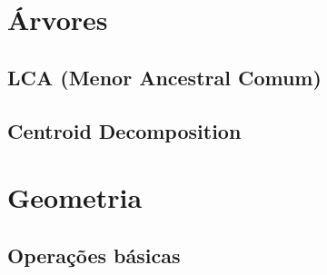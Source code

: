 \section{Árvores}

\subsection{LCA (Menor Ancestral Comum)}


\subsection{Centroid Decomposition}


% 

% 


\section{Geometria}

% 

% 

% 

\subsection{Operações básicas}


